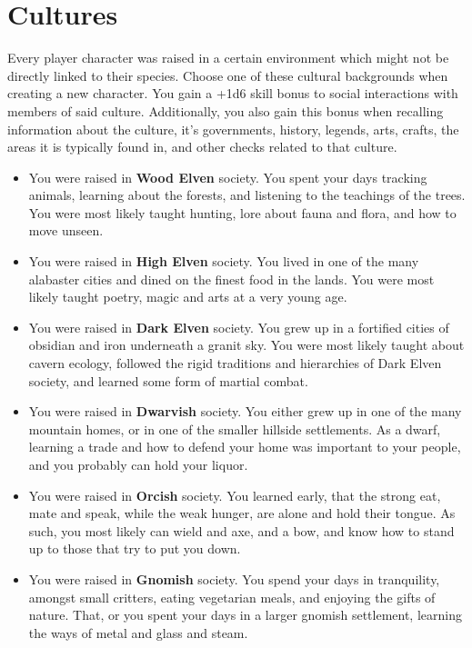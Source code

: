 \chapter{Cultures}\label{ch:cultures}
Every player character was raised in a certain environment which might not be directly linked to their species.
Choose one of these cultural backgrounds when creating a new character.
You gain a +1d6 skill bonus to social interactions with members of said culture.
Additionally, you also gain this bonus when recalling information about the culture, it's governments, history, legends, arts, crafts, the areas it is typically found in, and other checks related to that culture.

\begin{itemize}
    \item You were raised in \textbf{Wood Elven} society.
    You spent your days tracking animals, learning about the forests, and listening to the teachings of the trees.
    You were most likely taught hunting, lore about fauna and flora, and how to move unseen.
    \item You were raised in \textbf{High Elven} society.
    You lived in one of the many alabaster cities and dined on the finest food in the lands.
    You were most likely taught poetry, magic and arts at a very young age.
    \item You were raised in \textbf{Dark Elven} society.
    You grew up in a fortified cities of obsidian and iron underneath a granit sky.
    You were most likely taught about cavern ecology, followed the rigid traditions and hierarchies of Dark Elven society, and learned some form of martial combat.
    \item You were raised in \textbf{Dwarvish} society.
    You either grew up in one of the many mountain homes, or in one of the smaller hillside settlements.
    As a dwarf, learning a trade and how to defend your home was important to your people, and you probably can hold your liquor.
    \item You were raised in \textbf{Orcish} society.
    You learned early, that the strong eat, mate and speak, while the weak hunger, are alone and hold their tongue.
    As such, you most likely can wield and axe, and a bow, and know how to stand up to those that try to put you down.
    \item You were raised in \textbf{Gnomish} society.
    You spend your days in tranquility, amongst small critters, eating vegetarian meals, and enjoying the gifts of nature.
    That, or you spent your days in a larger gnomish settlement, learning the ways of metal and glass and steam.

\end{itemize}
